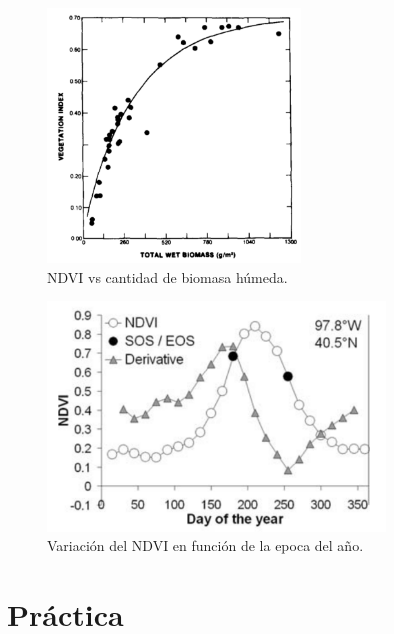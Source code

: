 \documentclass[handout]{beamer}
\begin{document}
\begin{frame}{\subsecname}
    \begin{figure}
    \centering
    \includegraphics[width=0.6\textwidth]{imagenes/avndvi.png}
    \caption{NDVI vs cantidad de biomasa h\'umeda.}
    \end{figure}
\end{frame}



\begin{frame}{\subsecname}
    \begin{figure}
    \centering
    \includegraphics[width=0.8\textwidth]{imagenes/ndvivst.png}
    \caption{Variaci\'on del NDVI en funci\'on de la epoca del año.}
    \end{figure}
\end{frame}


\section{Pr\'actica}
\end{document}

